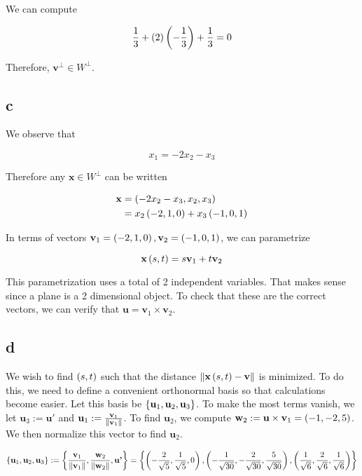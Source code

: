 \documentclass{article}
\begin{document}
We can compute

$$
\frac{1}{3} + (2) \left ( - \frac{1}{3} \right) + \frac{1}{3} = 0
$$

Therefore, $\bm{v}^{\perp} \in W^{\perp}$.

\subsection*{c}

We observe that

$$
x_1 = - 2x_2 - x_3
$$

Therefore any $\bm{x} \in W^{\perp}$ can be written

\begin{align*}
  \textbf{x} &= \left ( -2x_2 - x_3, x_2, x_3 \right) \\
  &= x_2 \left ( -2, 1, 0 \right) + x_3 \left ( -1, 0, 1 \right) \\
\end{align*}

In terms of vectors $\textbf{v}_1 = \left ( -2, 1, 0 \right), \textbf{v}_2 = \left ( -1, 0, 1 \right)$, we can parametrize

$$
\textbf{x} \left ( s, t \right) = s \textbf{v}_1 + t \textbf{v}_2
$$

This parametrization uses a total of 2 independent variables.
That makes sense since a plane is a 2 dimensional object.
To check that these are the correct vectors, we can verify that $\bm{u} = \bm{v}_1 \times \bm{v}_2$.

\subsection*{d}

We wish to find $\left ( s, t \right)$ such that the distance $\left\lVert\textbf{x} \left ( s, t \right) - \textbf{v}\right\rVert$ is minimized.
To do this, we need to define a convenient orthonormal basis so that calculations become easier.
Let this basis be $\left \{ \textbf{u}_1, \textbf{u}_2, \textbf{u}_3 \right \}$.
To make the most terms vanish, we let $\bm{u}_3 := \bm{u'}$ and $\textbf{u}_1 := \frac{\textbf{v}_1}{\left\lVert\textbf{v}_1\right\rVert}$.
To find $\bm{u}_2$, we compute $\textbf{w}_2 := \textbf{u} \times \textbf{v}_1 = \left ( -1, -2, 5 \right)$.
We then normalize this vector to find $\bm{u}_2$.


$$
\left \{ \textbf{u}_1, \textbf{u}_2, \textbf{u}_3 \right \} := \left \{ \frac{\textbf{v}_1}{\left\lVert\textbf{v}_1\right\rVert}, \frac{\textbf{w}_2}{\left\lVert\textbf{w}_2\right\rVert}, \textbf{u'} \right \} = \left \{ \left ( - \frac{2}{\sqrt{5}}, \frac{1}{\sqrt{5}}, 0 \right), \left ( - \frac{1}{\sqrt{30}}, - \frac{2}{\sqrt{30}}, \frac{5}{\sqrt{30}} \right), \left ( \frac{1}{\sqrt{6}}, \frac{2}{\sqrt{6}}, \frac{1}{\sqrt{6}} \right)  \right \}
$$
\end{document}
